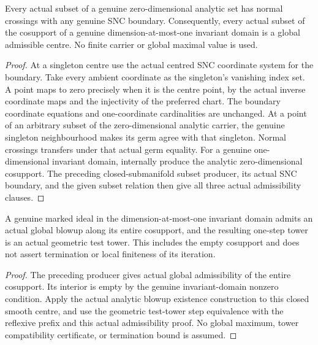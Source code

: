 \begin{theorem}
\label{hir:analytic-dimzero-snc-centres}
\leanok
Every actual subset of a genuine zero-dimensional analytic set has normal
crossings with any genuine SNC boundary. Consequently, every actual subset
of the cosupport of a genuine dimension-at-most-one invariant domain is a
global admissible centre. No finite carrier or global maximal value is used.
\end{theorem}
\begin{proof}
At a singleton centre use the actual centred SNC coordinate system for the
boundary. Take every ambient coordinate as the singleton's vanishing index
set. A point maps to zero precisely when it is the centre point, by the
actual inverse coordinate maps and the injectivity of the preferred chart.
The boundary coordinate equations and one-coordinate cardinalities are
unchanged. At a point of an arbitrary subset of the zero-dimensional analytic
carrier, the genuine singleton neighbourhood makes its germ agree with that
singleton. Normal crossings transfers under that actual germ equality.
For a genuine one-dimensional invariant domain, internally produce the
analytic zero-dimensional cosupport. The preceding closed-submanifold
subset producer, its actual SNC boundary, and the given subset relation
then give all three actual admissibility clauses.
\end{proof}

\begin{theorem}
\label{hir:one-dimensional-global-cosupport-step}
\leanok
A genuine marked ideal in the dimension-at-most-one invariant domain admits
an actual global blowup along its entire cosupport, and the resulting
one-step tower is an actual geometric test tower. This includes the empty
cosupport and does not assert termination or local finiteness of its iteration.
\end{theorem}
\begin{proof}
The preceding producer gives actual global admissibility of the entire
cosupport. Its interior is empty by the genuine invariant-domain nonzero
condition. Apply the actual analytic blowup existence construction to this
closed smooth centre, and use the geometric test-tower step equivalence
with the reflexive prefix and this actual admissibility proof. No global
maximum, tower compatibility certificate, or termination bound is assumed.
\end{proof}
